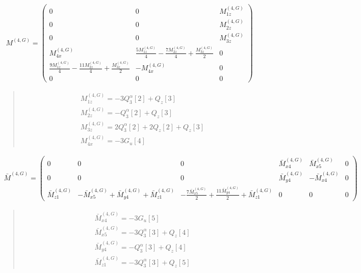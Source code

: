 \documentclass[fleqn,10pt]{jsarticle}
\begin{document}
\begin{align*}
M^{(4,G)} = \begin{pmatrix} 0 & 0 & M^{(4,G)}_{1z} \\ 0 & 0 & M^{(4,G)}_{2z} \\ 0 & 0 & M^{(4,G)}_{3z} \\ M^{(4,G)}_{4x} & \frac{5 M^{(4,G)}_{1z}}{4} - \frac{7 M^{(4,G)}_{2z}}{4} + \frac{M^{(4,G)}_{3z}}{2} & 0 \\ \frac{9 M^{(4,G)}_{1z}}{4} - \frac{11 M^{(4,G)}_{2z}}{4} + \frac{M^{(4,G)}_{3z}}{2} & - M^{(4,G)}_{4x} & 0 \\ 0 & 0 & 0 \end{pmatrix}
\end{align*}
\begin{quote}
\begin{align*}
& M^{(4,G)}_{1z} = - 3 Q_{3}^{\alpha}[2] + Q_{z}[3] \\
& M^{(4,G)}_{2z} = - Q_{3}^{\alpha}[2] + Q_{z}[3] \\
& M^{(4,G)}_{3z} = 2 Q_{3}^{\alpha}[2] + 2 Q_{z}[2] + Q_{z}[3] \\
& M^{(4,G)}_{4x} = - 3 G_{u}[4]
\end{align*}
\end{quote}
\begin{align*}
\bar{M}^{(4,G)} = \begin{pmatrix} 0 & 0 & 0 & \bar{M}^{(4,G)}_{x4} & \bar{M}^{(4,G)}_{x5} & 0 \\ 0 & 0 & 0 & \bar{M}^{(4,G)}_{y4} & - \bar{M}^{(4,G)}_{x4} & 0 \\ \bar{M}^{(4,G)}_{z1} & - \bar{M}^{(4,G)}_{x5} + \bar{M}^{(4,G)}_{y4} + \bar{M}^{(4,G)}_{z1} & - \frac{7 \bar{M}^{(4,G)}_{x5}}{2} + \frac{11 \bar{M}^{(4,G)}_{y4}}{2} + \bar{M}^{(4,G)}_{z1} & 0 & 0 & 0 \end{pmatrix}
\end{align*}
\begin{quote}
\begin{align*}
& \bar{M}^{(4,G)}_{x4} = - 3 G_{u}[5] \\
& \bar{M}^{(4,G)}_{x5} = - 3 Q_{3}^{\alpha}[3] + Q_{z}[4] \\
& \bar{M}^{(4,G)}_{y4} = - Q_{3}^{\alpha}[3] + Q_{z}[4] \\
& \bar{M}^{(4,G)}_{z1} = - 3 Q_{3}^{\alpha}[3] + Q_{z}[5]
\end{align*}
\end{quote}
\end{document}
